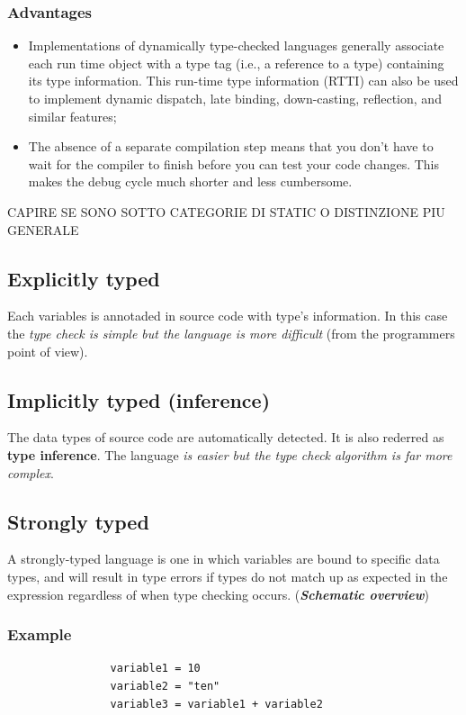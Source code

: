 \documentclass[12pt]{article}
\begin{document}
		\subsubsection{Advantages}
			\begin{itemize}
				\item Implementations of dynamically type-checked languages generally associate each run time object with a type tag (i.e., a reference to a type) containing its type information. This run-time type information (RTTI) can also be used to implement dynamic dispatch, late binding, down-casting, reflection, and similar features;
				\item The absence of a separate compilation step means that you don’t have to wait for the compiler to finish before you can test your code changes. This makes the debug cycle much shorter and less cumbersome.
			\end{itemize}
			
		CAPIRE SE SONO SOTTO CATEGORIE DI STATIC O DISTINZIONE PIU GENERALE 
	\subsection{Explicitly typed}
		Each variables is annotaded in source code with type's information. In this case the \textit{type check is simple but the language is more difficult} (from the programmers point of view).
			
	\subsection{Implicitly typed (inference)}
		The data types of source code are automatically detected. It is also rederred as \textbf{type inference}. The language \textit{is easier but the type check algorithm is far more complex}.
	\subsection{Strongly typed}
		A strongly-typed language is one in which variables are bound to specific data types, and will result in type errors if types do not match up as expected in the expression regardless of when type checking occurs. (\textbf{\textit{Schematic overview}})\\
		\subsubsection{Example}
			\begin{lstlisting}
				variable1 = 10
				variable2 = "ten"
				variable3 = variable1 + variable2
			\end{lstlisting}
\end{document}

